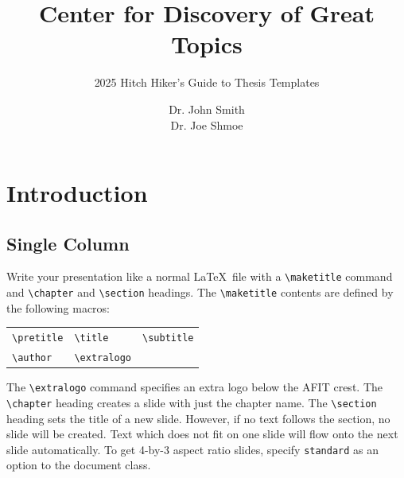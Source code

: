 \documentclass{afitdefense}
\title{Center for Discovery of Great Topics}
\subtitle{2025 Hitch Hiker's Guide to Thesis Templates}
\author{Dr. John Smith \\ Dr. Joe Shmoe}
\begin{document}
\maketitle

\chapter{Introduction}

\section{Single Column}

Write your presentation like a normal \LaTeX\ file with a \verb|\maketitle|
command and \verb|\chapter| and \verb|\section| headings. The \verb|\maketitle|
contents are defined by the following macros:
\begin{center}
    \begin{tabular}{l@{\qquad}l@{\qquad}l}
        \verb|\pretitle| &
        \verb|\title| &
        \verb|\subtitle| \\
        \verb|\author| &
        \verb|\extralogo|
    \end{tabular}
\end{center}
The \verb|\extralogo| command specifies an extra logo below the AFIT crest. The
\verb|\chapter| heading creates a slide with just the chapter name. The
\verb|\section| heading sets the title of a new slide. However, if no text
follows the section, no slide will be created. Text which does not fit on one
slide will flow onto the next slide automatically. To get 4-by-3 aspect ratio
slides, specify \verb|standard| as an option to the document class.
\end{document}
